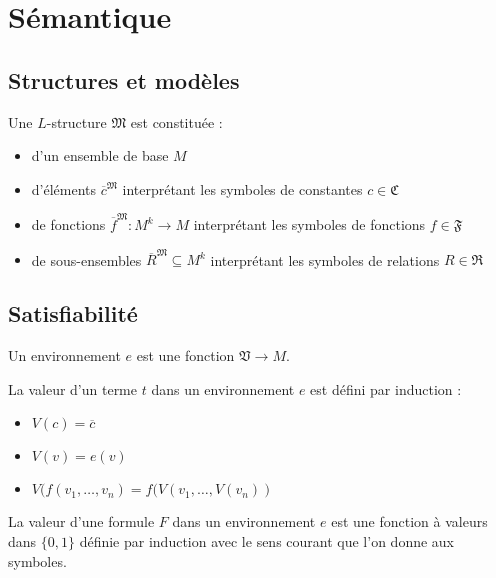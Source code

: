\documentclass[9pt]{beamer}
\begin{document}
\begin{frame}

  \begin{center}
    
  \end{center}

\end{frame}

\section{Sémantique}

\subsection{Structures et modèles}

\begin{frame}
\begin{definition}
  Une $L$-structure $\mathfrak{M}$ est constituée :
  \begin{itemize}
  \item d'un ensemble de base $M$
  \item d'éléments $\overline{c}^{\mathfrak{M}}$ interprétant les symboles de constantes $c \in \mathfrak{C}$
  \item de fonctions $\overline{f}^{\mathfrak{M}} : M^k \rightarrow M$ interprétant les symboles de fonctions $f \in \mathfrak{F}$
  \item de sous-ensembles $\overline{R}^{\mathfrak{M}} \subseteq M^k$ interprétant les symboles de relations $R \in \mathfrak{R}$
  \end{itemize}
\end{definition}
\end{frame}

\subsection{Satisfiabilité}

\begin{frame}
\begin{definition}
  Un environnement $e$ est une fonction $\mathfrak{V} \rightarrow M$.

  La valeur d'un terme $t$ dans un environnement $e$ est défini par induction :
  \begin{itemize}
  \item $V(c) = \overline{c}$
  \item $V(v) = e(v)$
  \item $V(f(v_1,\dots,v_n) = f(V(v_1,\dots,V(v_n))$
  \end{itemize}

  La valeur d'une formule $F$ dans un environnement $e$ est une fonction à valeurs dans $\{0,1\}$ définie par induction avec le sens courant que l'on donne aux symboles.
\end{definition}
\end{frame}
\end{document}

